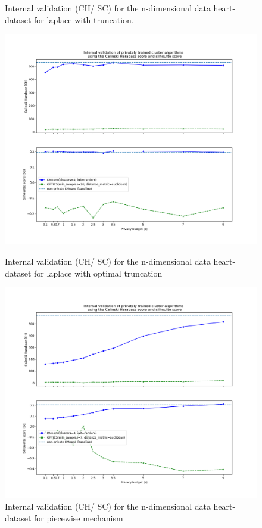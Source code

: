 \begin{figure}[H]
\begin{minipage}[c]{0.49\textwidth}
        \caption{Internal validation (CH/ SC) for the n-dimensional data heart-dataset for laplace with truncation.}
        \label{fig:appendix-internal-validation-heart-dataset_comparison_nd-laplace-truncated}
    \end{minipage}
    \begin{minipage}[c]{0.49\textwidth}
        \includegraphics[width=1\textwidth]{Results/nd-laplace-optimal-truncated/heart-dataset/ch-and-sc.png}
        \caption{Internal validation (CH/ SC) for the n-dimensional data heart-dataset for laplace with optimal truncation}
        \label{fig:appendix-internal-validation-heart-dataset_comparison_nd-laplace-optimal-truncated}
    \end{minipage}
    \begin{minipage}[c]{0.49\textwidth}
        \includegraphics[width=1\textwidth]{Results/nd-piecewise/heart-dataset/ch-and-sc.png}
        \caption{Internal validation (CH/ SC) for the n-dimensional data heart-dataset for piecewise mechanism}
        \label{fig:appendix-internal-validation-heart-dataset_comparison_nd-piecewise}
    \end{minipage}
\end{figure}
